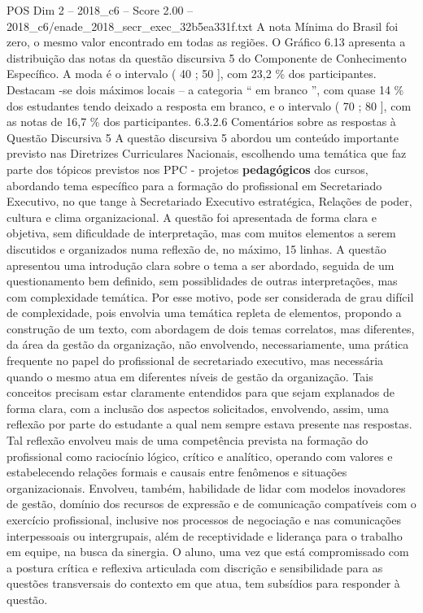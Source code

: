 \begin{textsample}{POS Dim 2 – 2018\_c6 – Score 2.00 – 2018\_c6/enade\_2018\_secr\_exec\_32b5ea331f.txt}
A nota Mínima do Brasil foi zero, o mesmo valor encontrado em todas as regiões.
O Gráfico 6.13 apresenta a distribuição das notas da questão discursiva 5 do Componente de Conhecimento Específico.
A moda é o intervalo ( 40 ; 50 ], com 23,2 \% dos participantes.
Destacam -se dois máximos locais – a categoria “ em branco ”, com quase 14 \% dos estudantes tendo deixado a resposta em branco, e o intervalo ( 70 ; 80 ], com as notas de 16,7 \% dos participantes. 6.3.2.6 Comentários sobre as respostas à Questão Discursiva 5 A questão discursiva 5 abordou um conteúdo importante previsto nas Diretrizes Curriculares Nacionais, escolhendo uma temática que faz parte dos tópicos previstos nos PPC - projetos \textbf{pedagógicos} dos cursos, abordando tema específico para a formação do profissional em Secretariado Executivo, no que tange à Secretariado Executivo estratégica, Relações de poder, cultura e clima organizacional.
A questão foi apresentada de forma clara e objetiva, sem dificuldade de interpretação, mas com muitos elementos a serem discutidos e organizados numa reflexão de, no máximo, 15 linhas.
A questão apresentou uma introdução clara sobre o tema a ser abordado, seguida de um questionamento bem definido, sem possiblidades de outras interpretações, mas com complexidade temática.
Por esse motivo, pode ser considerada de grau difícil de complexidade, pois envolvia uma temática repleta de elementos, propondo a construção de um texto, com abordagem de dois temas correlatos, mas diferentes, da área da gestão da organização, não envolvendo, necessariamente, uma prática frequente no papel do profissional de secretariado executivo, mas necessária quando o mesmo atua em diferentes níveis de gestão da organização.
Tais conceitos precisam estar claramente entendidos para que sejam explanados de forma clara, com a inclusão dos aspectos solicitados, envolvendo, assim, uma reflexão por parte do estudante a qual nem sempre estava presente nas respostas.
Tal reflexão envolveu mais de uma competência prevista na formação do profissional como raciocínio lógico, crítico e analítico, operando com valores e estabelecendo relações formais e causais entre fenômenos e situações organizacionais.
Envolveu, também, habilidade de lidar com modelos inovadores de gestão, domínio dos recursos de expressão e de comunicação compatíveis com o exercício profissional, inclusive nos processos de negociação e nas comunicações interpessoais ou intergrupais, além de receptividade e liderança para o trabalho em equipe, na busca da sinergia.
O aluno, uma vez que está compromissado com a postura crítica e reflexiva articulada com discrição e sensibilidade para as questões transversais do contexto em que atua, tem subsídios para responder à questão.

\end{textsample}
